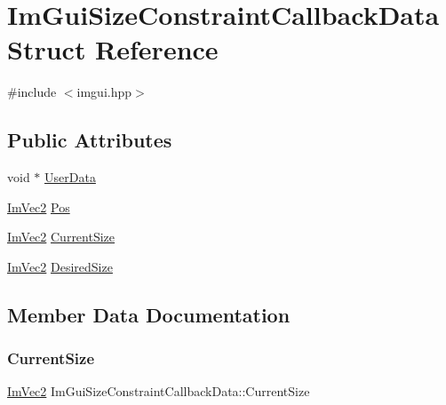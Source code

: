 \hypertarget{struct_im_gui_size_constraint_callback_data}{}\section{Im\+Gui\+Size\+Constraint\+Callback\+Data Struct Reference}
\label{struct_im_gui_size_constraint_callback_data}


{\ttfamily \#include $<$imgui.\+hpp$>$}

\subsection*{Public Attributes}
\begin{DoxyCompactItemize}
\item 
void $\ast$ \hyperlink{struct_im_gui_size_constraint_callback_data_a3b2fb1bd849f82edc78377f361433eac}{User\+Data}
\item 
\hyperlink{struct_im_vec2}{Im\+Vec2} \hyperlink{struct_im_gui_size_constraint_callback_data_ad3d81153905b00e6d513af4478d82cfd}{Pos}
\item 
\hyperlink{struct_im_vec2}{Im\+Vec2} \hyperlink{struct_im_gui_size_constraint_callback_data_ac7d5013d841044f410cba69344bdb4a1}{Current\+Size}
\item 
\hyperlink{struct_im_vec2}{Im\+Vec2} \hyperlink{struct_im_gui_size_constraint_callback_data_a1080a748a1769de07c5ae1e98de99ea3}{Desired\+Size}
\end{DoxyCompactItemize}


\subsection{Member Data Documentation}
\hypertarget{struct_im_gui_size_constraint_callback_data_ac7d5013d841044f410cba69344bdb4a1}{}\label{struct_im_gui_size_constraint_callback_data_ac7d5013d841044f410cba69344bdb4a1} 
\subsubsection{\texorpdfstring{Current\+Size}{CurrentSize}}
{\footnotesize\ttfamily \hyperlink{struct_im_vec2}{Im\+Vec2} Im\+Gui\+Size\+Constraint\+Callback\+Data\+::\+Current\+Size}

